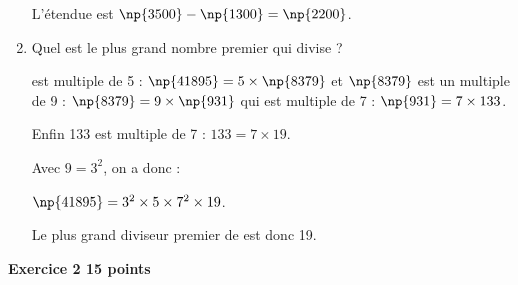 \documentclass[10pt]{article}
\begin{document}
\begin{enumerate}
L'étendue est $\np{3500} - \np{1300} = \np{2200}$.
\item Quel est le plus grand nombre premier qui divise  ?

 est multiple de 5 : $\np{41895} = 5 \times \np{8379}$ et $\np{8379}$ est un multiple de 9 : $\np{8379} = 9 \times \np{931}$ qui est  multiple de 7 : $\np{931} = 7 \times 133$.

Enfin 133 est multiple de 7  : $133 = 7 \times 19$.

Avec $9 = 3^2$, on a donc :

$\np{41895} = 3^2 \times 5 \times 7^2 \times 19$.

Le plus grand diviseur premier de  est donc 19.
\end{enumerate}

\vspace{0.5cm}

\textbf{Exercice 2 \hfill 15 points}

\medskip

%
%
%
%
%
%
\end{document}
